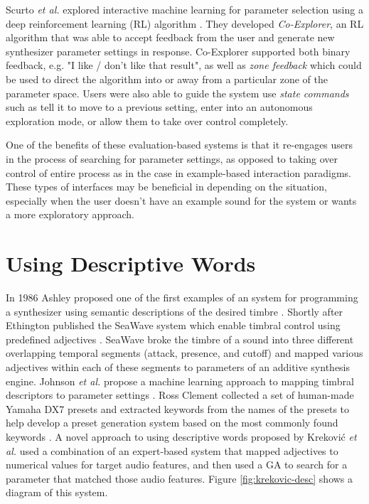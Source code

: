 Scurto \textit{et al.} \cite{scurto2021designing} explored interactive machine learning for parameter selection using a deep reinforcement learning (RL) algorithm \cite{sutton2018reinforcement}. They developed \textit{Co-Explorer}, an RL algorithm that was able to accept feedback from the user and generate new synthesizer parameter settings in response. Co-Explorer supported both binary feedback, e.g. "I like / don't like that result", as well as \textit{zone feedback} which could be used to direct the algorithm into or away from a particular zone of the parameter space. Users were also able to guide the system use \textit{state commands} such as tell it to move to a previous setting, enter into an autonomous exploration mode, or allow them to take over control completely.

One of the benefits of these evaluation-based systems is that it re-engages users in the process of searching for parameter settings, as opposed to taking over control of entire process as in the case in example-based interaction paradigms. These types of interfaces may be beneficial in depending on the situation, especially when the user doesn't have an example sound for the system or wants a more exploratory approach.

\section{Using Descriptive Words}
In 1986 Ashley proposed one of the first examples of an system for programming a synthesizer using semantic descriptions of the desired timbre \cite{ashley1986knowledge}. Shortly after Ethington published the SeaWave system which enable timbral control using predefined adjectives \cite{ethington1994seawave}. SeaWave broke the timbre of a sound into three different overlapping temporal segments (attack, presence, and cutoff) and mapped various adjectives within each of these segments to parameters of an additive synthesis engine. Johnson \textit{et al.} propose a machine learning approach to mapping timbral descriptors to parameter settings \cite{johnson2006timbre}. Ross Clement collected a set of human-made Yamaha DX7 presets and extracted keywords from the names of the presets to help develop a preset generation system based on the most commonly found keywords \cite{clement2011automatic}. A novel approach to using descriptive words proposed by Krekovi\'{c} \textit{et al.} \cite{krekovic2016algorithm} used a combination of an expert-based system that mapped adjectives to numerical values for target audio features, and then used a GA to search for a parameter that matched those audio features. Figure \ref{fig:krekovic-desc} shows a diagram of this system.

